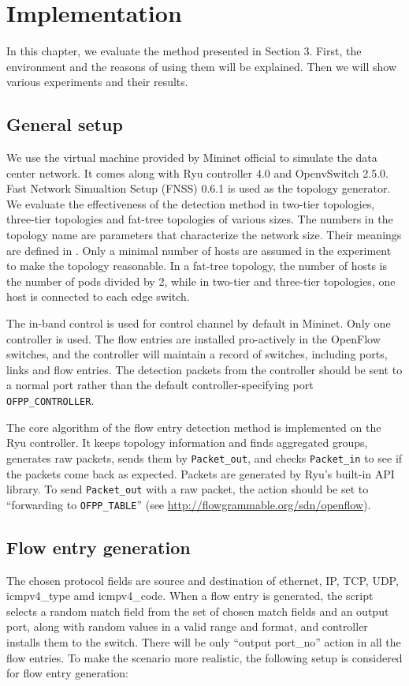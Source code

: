 \documentclass[conference]{IEEEtran}
\begin{document}
\section{Implementation}
\label{Implementation_and_Evaluation}
In this chapter, we evaluate the method presented in Section 3. First, the environment and the reasons of using them will be explained. Then we will show various experiments and their results.

\subsection{General setup}
We use the virtual machine provided by Mininet official to simulate the data center network. It comes along with Ryu controller 4.0 and OpenvSwitch 2.5.0. Fast Network Simualtion Setup (FNSS) 0.6.1 is used as the topology generator. We evaluate the effectiveness of the detection method in two-tier topologies, three-tier topologies and fat-tree topologies of various sizes. The numbers in the topology name are parameters that characterize the network size. Their meanings are defined in \cite{FNSS}. Only a minimal number of hosts are assumed in the experiment to make the topology reasonable. In a fat-tree topology, the number of hosts is the number of pods divided by 2, while in two-tier and three-tier topologies, one host is connected to each edge switch.

The in-band control is used for control channel by default in Mininet. Only one controller is used. The flow entries are installed pro-actively in the OpenFlow switches, and the controller will maintain a record of switches, including ports, links and flow entries. The detection packets from the controller should be sent to a normal port rather than the default controller-specifying port \texttt{OFPP\_CONTROLLER}.

The core algorithm of the flow entry detection method is implemented on the Ryu controller. It keeps topology information and finds aggregated groups, generates raw packets, sends them by \texttt{Packet\_out}, and checks \texttt{Packet\_in} to see if the packets come back as expected. Packets are generated by Ryu's built-in API library. To send \texttt{Packet\_out} with a raw packet, the action should be set to ``forwarding to \texttt{OFPP\_TABLE}'' (see \url{http://flowgrammable.org/sdn/openflow}).

\subsection{Flow entry generation}
\label{flow_entry_generation}
The chosen protocol fields are source and destination of ethernet, IP, TCP, UDP, icmpv4\_type amd icmpv4\_code. When a flow entry is generated, the script selects a random match field from the set of chosen match fields and an output port, along with random values in a valid range and format, and controller installs them to the switch. There will be only ``output port\_no'' action in all the flow entries. To make the scenario more realistic, the following setup is considered for flow entry generation:
\end{document}
